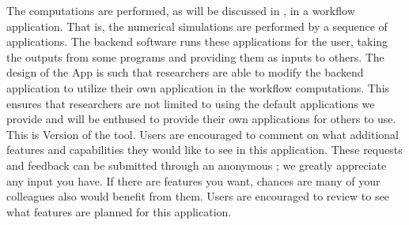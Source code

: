The computations are performed, as will be discussed in , in a workflow application. That is, the numerical simulations are performed by a sequence of applications. The \texttt{\getsoftwarename{}} backend software runs these applications for the user, taking the outputs from some programs and providing them as inputs to others. The design of the \texttt{\getsoftwarename{}} App is such that researchers are able to modify the backend application to utilize their own application in the workflow computations. This ensures that researchers are not limited to using the default applications we provide and will be enthused to provide their own applications for others to use.\\

This is Version \getsoftwareversion{} of the tool. Users are
encouraged to comment on what additional features and capabilities
they would like to see in this application. These requests and
feedback can be submitted through an anonymous ; we greatly appreciate any input you have. If there are
features you want, chances are many of your colleagues also would
benefit from them. Users are encouraged to review
 to see what features are planned for this
application.
